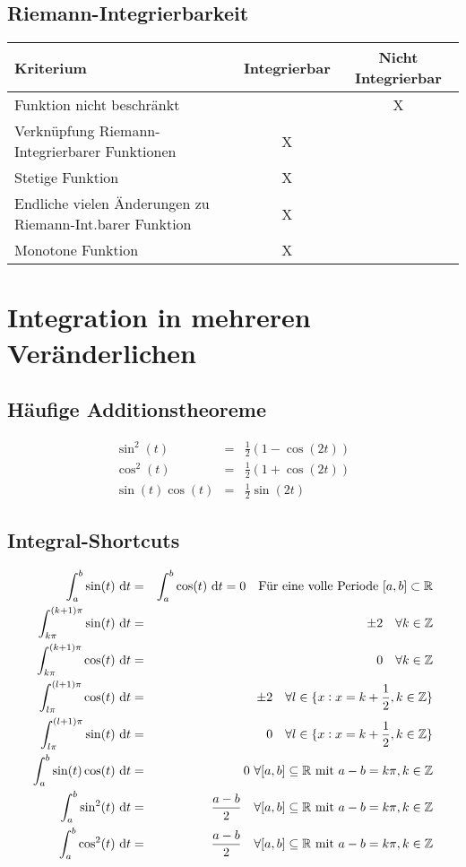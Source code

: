 \section{Riemann-Integrierbarkeit}
\begin{center}
    \begin{tabular}{lcc}
        \toprule
        Kriterium & Integrierbar & Nicht Integrierbar \\
        \midrule
        Funktion nicht beschränkt & & X \\
        Verknüpfung Riemann-Integrierbarer Funktionen & X \\
        Stetige Funktion & X\\
        Endliche vielen Änderungen zu Riemann-Int.barer Funktion & X\\
        Monotone Funktion & X\\
        \bottomrule
    \end{tabular}
\end{center}

\chapter{Integration in mehreren Veränderlichen}
\section{Häufige Additionstheoreme}
\begin{eqnarray*}
    \sin^2(t) &=& \frac{1}{2} (1 - \cos(2t))\\
    \cos^2(t) &=& \frac{1}{2} (1 + \cos(2t))\\
    \sin(t) \cos(t) &=& \frac{1}{2} \sin(2t)
\end{eqnarray*}

\section{Integral-Shortcuts}
\begin{eqnarray*}
    \int_{a}^{b}{\sin(t)\text{ d}t} &=& \int_{a}^{b}{\cos(t)\text{ d}t} = 0 \quad \text{Für eine volle Periode} \ [a,b] \subset \mathbb{R} \\
    \int_{k\pi}^{(k+1)\pi}{\sin(t)\text{ d}t} &=& \pm 2 \quad \forall k \in \mathbb{Z} \\
    \int_{k\pi}^{(k+1)\pi}{\cos(t)\text{ d}t} &=& 0 \quad \forall k \in \mathbb{Z} \\
    \int_{l\pi}^{(l+1)\pi}{\cos(t)\text{ d}t} &=& \pm 2 \quad \forall l \in \{x:x=k+\frac{1}{2}, k\in\mathbb{Z}\} \\
    \int_{l\pi}^{(l+1)\pi}{\sin(t)\text{ d}t} &=& 0 \quad \forall l \in \{x:x=k+\frac{1}{2}, k\in\mathbb{Z}\} \\
    \int_{a}^{b}{\sin(t)\cos(t)\text{ d}t} &=& 0 \ \forall [a,b]\subseteq\mathbb{R} \ \text{mit} \ a-b = k\pi, k\in\mathbb{Z} \\
    \int_{a}^{b}{\sin^2(t)\text{ d}t} &=& \frac{a-b}{2} \quad \forall [a,b]\subseteq\mathbb{R} \ \text{mit} \ a-b = k\pi, k\in\mathbb{Z} \\
    \int_{a}^{b}{\cos^2(t)\text{ d}t} &=& \frac{a-b}{2} \quad \forall [a,b]\subseteq\mathbb{R} \ \text{mit} \ a-b = k\pi, k\in\mathbb{Z}
\end{eqnarray*}
